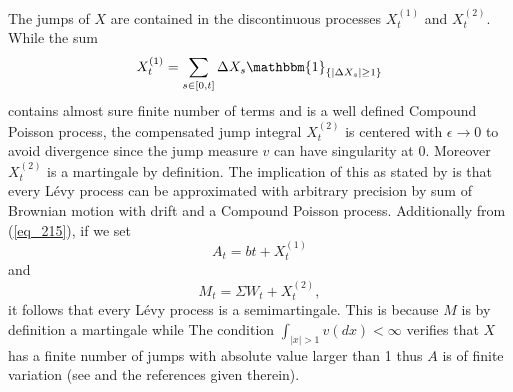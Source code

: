 \begin{interpretation}The jumps of $X$ are contained in the discontinuous processes $ X^{(1)}_t$ and $ X^{(2)}_t$. While the sum $$ X^{(1)}_t = \sum_{s \in [0,t]} \Delta X_s \mathbbm{1}_{\{|\Delta X_s|\geq 1\}} $$ contains almost sure finite number of terms and is a well defined Compound Poisson process, the compensated jump integral $X^{(2)}_t$ is centered with $\epsilon \to 0$ to avoid divergence since the jump measure $v$ can have singularity at 0. Moreover $ X^{(2)}_t$ is a martingale by definition.
The implication of this as stated by  is that every L\'evy process can be approximated with arbitrary precision by sum of Brownian motion with drift and a Compound Poisson process.
Additionally from (\ref{eq_215}), if we set $$A_t = bt + X^{(1)}_t$$ and $$M_t = \Sigma W_t + X^{(2)}_t,$$ it follows that every L\'evy process is a semimartingale. This is because $M$ is by definition a martingale while The condition $\int_{|x| > 1} v(dx)< \infty$ verifies that $X$ has a finite number of jumps with absolute value larger than 1 thus $A$ is of finite variation (see  and the references given therein).
\end{interpretation}
  